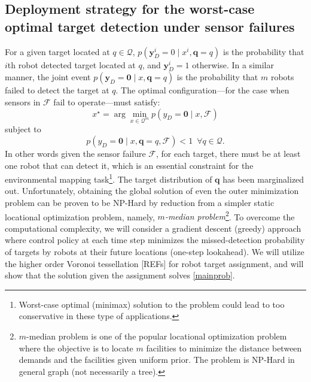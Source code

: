 \documentclass[letterpaper, 10 pt, conference]{ieeeconf}
\begin{document}
\subsection{Deployment strategy for the worst-case optimal target detection under sensor failures}
\label{sec:sec23}
For a given target located at $q \in \mathcal{Q}$, 
$
p(\bm{y}_{D}^i =0 \mid x^i,\bm{q} = q)
$
is the probability that $i$th robot detected target located at $q$, and $\bm{y}_{D}^i = 1$ otherwise.
In a similar manner, the joint event $p(\bm{y}_{D}=\bm{0} \mid x, \bm{q}=q)$ is the probability that $m$ robots failed to detect the target at $q$. 
The optimal configuration---for the case when sensors in $\mathcal{F}$ fail to operate---must satisfy:
\begin{equation}
x^{\star} = \arg
\min_{x \in \mathcal{Q}^m} 
p(y_{D} = \bm{0} \mid x, \mathcal{F})
\label{mainprob}
\end{equation}
subject to
\begin{equation}
p(y_D = \bm{0} \mid x,\bm{q}=q,\mathcal{F}) <1\,\,\,\forall q \in \mathcal{Q}.
\label{const}
\end{equation}
In other words given the sensor failure $\mathcal{F}$, for each target, there must be at least one robot that can detect it, which is an essential constraint for the environmental mapping task\footnote{Worst-case optimal (minimax) solution to the problem could lead to too conservative in these type of applications.}.
The target distribution of $\bm{q}$ has been marginalized out. Unfortunately, obtaining the global solution of even the outer minimization problem can be proven to be NP-Hard by reduction from a simpler static locational optimization problem, namely, \emph{$m$-median problem}\footnote{$m$-median problem is one of the popular locational optimization problem where the objective is to locate $m$ facilities to minimize the distance between demands and the facilities given uniform prior. The problem is NP-Hard in general graph (not necessarily a tree).}. To overcome the computational complexity, we will consider a gradient descent (greedy) approach where control policy at each time step minimizes the missed-detection probability of targets by robots at their future locations (one-step lookahead). We will utilize the higher order Voronoi tessellation [REFs] for robot target assignment, and will show that the solution given the assignment solves \eqref{mainprob}.
\end{document}
